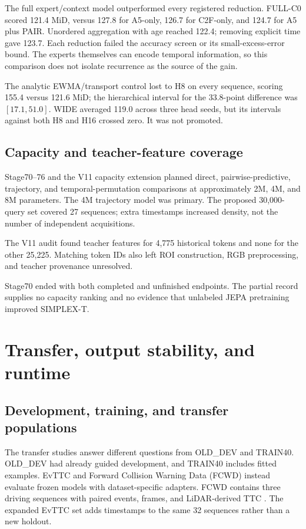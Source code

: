 The full expert/context model outperformed every registered reduction. FULL-C0 scored 121.4 MiD, versus 127.8 for A5-only, 126.7 for C2F-only, and 124.7 for A5 plus PAIR. Unordered aggregation with age reached 122.4; removing explicit time gave 123.7. Each reduction failed the accuracy screen or its small-excess-error bound. The experts themselves can encode temporal information, so this comparison does not isolate recurrence as the source of the gain. 

The analytic EWMA/transport control lost to H8 on every sequence, scoring 155.4 versus 121.6 MiD; the hierarchical interval for the 33.8-point difference was $[17.1,51.0]$. WIDE averaged 119.0 across three head seeds, but its intervals against both H8 and H16 crossed zero. It was not promoted. 

\subsection{Capacity and teacher-feature coverage}

Stage70--76 and the V11 capacity extension planned direct, pairwise-predictive, trajectory, and temporal-permutation comparisons at approximately 2M, 4M, and 8M parameters. The 4M trajectory model was primary. The proposed 30,000-query set covered 27 sequences; extra timestamps increased density, not the number of independent acquisitions.

The V11 audit found teacher features for 4,775 historical tokens and none for the other 25,225. Matching token IDs also left ROI construction, RGB preprocessing, and teacher provenance unresolved. 

Stage70 ended with both completed and unfinished endpoints. The partial record supplies no capacity ranking and no evidence that unlabeled JEPA pretraining improved SIMPLEX-T. 

\section{Transfer, output stability, and runtime}
\label{sec:transfer-context}

\subsection{Development, training, and transfer populations}

The transfer studies answer different questions from OLD\_DEV and TRAIN40. OLD\_DEV had already guided development, and TRAIN40 includes fitted examples. EvTTC and Forward Collision Warning Data (FCWD) instead evaluate frozen models with dataset-specific adapters. FCWD contains three driving sequences with paired events, frames, and LiDAR-derived TTC \citep{eventaided}. The expanded EvTTC set adds timestamps to the same 32 sequences rather than a new holdout.

